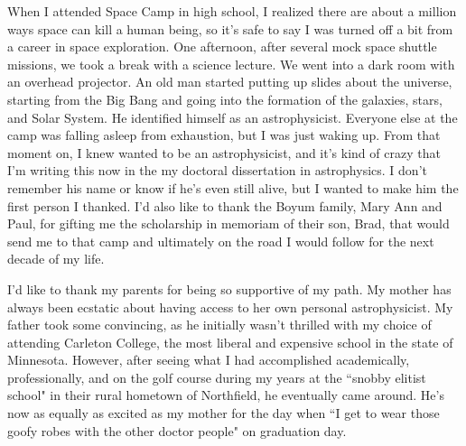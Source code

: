 When I attended Space Camp in high school, I realized there are about a million ways space can kill a human being, so it's safe to say I was turned off a bit from a career in space exploration. One afternoon, after several mock space shuttle missions, we took a break with a science lecture. We went into a dark room with an overhead projector. An old man started putting up slides about the universe, starting from the Big Bang and going into the formation of the galaxies, stars, and Solar System. He identified himself as an astrophysicist. Everyone else at the camp was falling asleep from exhaustion, but I was just waking up. From that moment on, I knew wanted to be an astrophysicist, and it's kind of crazy that I'm writing this now in the my doctoral dissertation in astrophysics. I don't remember his name or know if he's even still alive, but I wanted to make him the first person I thanked. I'd also like to thank the Boyum family, Mary Ann and Paul, for gifting me the scholarship in memoriam of their son, Brad, that would send me to that camp and ultimately on the road I would follow for the next decade of my life.

I'd like to thank my parents for being so supportive of my path. My mother has always been ecstatic about having access to her own personal astrophysicist. My father took some convincing, as he initially wasn't thrilled with my choice of attending Carleton College, the most liberal and expensive school in the state of Minnesota. However, after seeing what I had accomplished academically, professionally, and on the golf course during my years at the ``snobby elitist school" in their rural hometown of Northfield, he eventually came around. He's now as equally as excited as my mother for the day when ``I get to wear those goofy robes with the other doctor people" on graduation day.

